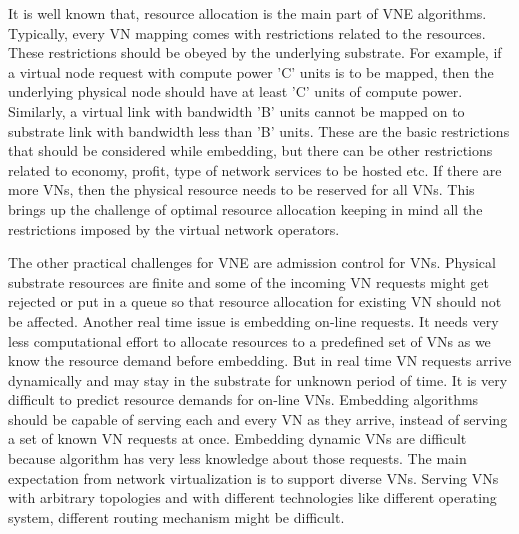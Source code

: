 \documentclass[article,dr=phil,type=msc ,colorback,accentcolor=tud4b]{tudthesis}
\begin{document}
It is well known that, resource allocation is the main part of VNE algorithms. Typically, every VN mapping comes with restrictions related to the resources. These restrictions should be obeyed by the underlying substrate. For example, if a virtual node request with compute power 'C' units is to be mapped, then the underlying physical node should have at least 'C' units of compute power. Similarly, a virtual link with bandwidth 'B' units cannot be mapped on to substrate link with bandwidth less than 'B' units. These are the basic restrictions that should be considered while embedding, but there can be other restrictions related to economy, profit, type of network services to be hosted etc. If there are more VNs, then the physical resource needs to be reserved for all VNs. This brings up the challenge of optimal resource allocation keeping in mind all the restrictions imposed by the virtual network operators.\newline

The other practical challenges for VNE are admission control for VNs. Physical substrate resources are finite and some of the incoming VN requests might get rejected or put in a queue so that resource allocation for existing VN should not be affected. Another real time issue is embedding on-line requests. It needs very less computational effort to allocate resources to a predefined set of VNs as we know the resource demand before embedding. But in real time VN requests arrive dynamically and may stay in the substrate for unknown period of time. It is very difficult to predict resource demands for on-line VNs. Embedding algorithms should be capable of serving each and every VN as they arrive, instead of serving a set of known VN requests at once. Embedding dynamic VNs are difficult because algorithm has very less knowledge about those requests. The main expectation from network virtualization is to support diverse VNs. Serving VNs with arbitrary topologies and with different technologies like different operating system, different routing mechanism might be difficult.\newline
\end{document}
